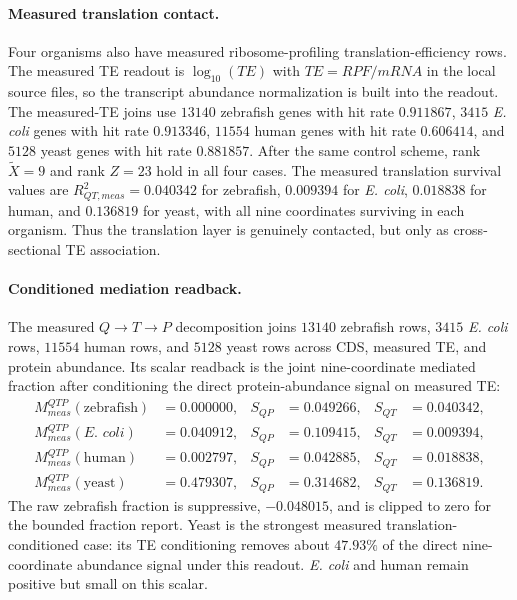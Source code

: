 \paragraph{Measured translation contact.}
Four organisms also have measured ribosome-profiling translation-efficiency rows.  The measured TE readout is $\log_{10}(TE)$ with $TE=RPF/mRNA$ in the local source files, so the transcript abundance normalization is built into the readout.  The measured-TE joins use $13140$ zebrafish genes with hit rate $0.911867$, $3415$ \emph{E. coli} genes with hit rate $0.913346$, $11554$ human genes with hit rate $0.606414$, and $5128$ yeast genes with hit rate $0.881857$.  After the same control scheme, rank $\widetilde X=9$ and rank $Z=23$ hold in all four cases.  The measured translation survival values are $R^2_{QT,meas}=0.040342$ for zebrafish, $0.009394$ for \emph{E. coli}, $0.018838$ for human, and $0.136819$ for yeast, with all nine coordinates surviving in each organism.  Thus the translation layer is genuinely contacted, but only as cross-sectional TE association.

\paragraph{Conditioned mediation readback.}
The measured $Q\to T\to P$ decomposition joins $13140$ zebrafish rows, $3415$ \emph{E. coli} rows, $11554$ human rows, and $5128$ yeast rows across CDS, measured TE, and protein abundance.  Its scalar readback is the joint nine-coordinate mediated fraction after conditioning the direct protein-abundance signal on measured TE:
$$
\begin{aligned}
M^{QTP}_{meas}(\text{zebrafish}) &= 0.000000, & S_{QP} &= 0.049266, & S_{QT} &= 0.040342,\\
M^{QTP}_{meas}(\textit{E. coli}) &= 0.040912, & S_{QP} &= 0.109415, & S_{QT} &= 0.009394,\\
M^{QTP}_{meas}(\text{human}) &= 0.002797, & S_{QP} &= 0.042885, & S_{QT} &= 0.018838,\\
M^{QTP}_{meas}(\text{yeast}) &= 0.479307, & S_{QP} &= 0.314682, & S_{QT} &= 0.136819.
\end{aligned}
$$
The raw zebrafish fraction is suppressive, $-0.048015$, and is clipped to zero for the bounded fraction report.  Yeast is the strongest measured translation-conditioned case: its TE conditioning removes about $47.93\%$ of the direct nine-coordinate abundance signal under this readout.  \emph{E. coli} and human remain positive but small on this scalar.

